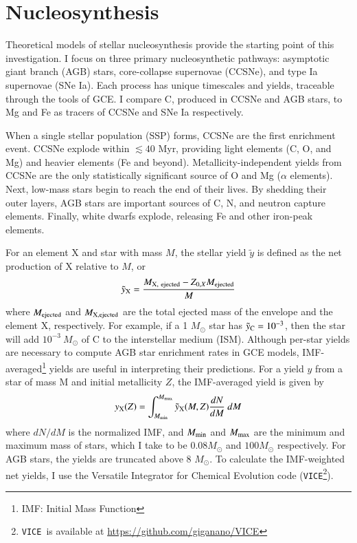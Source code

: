 \documentclass[12pt,oneside]{report}
\newcommand{\VICE}{\texttt{VICE}}
\newcommand{\sun}{\ensuremath{\odot}}
\begin{document}
\chapter{Nucleosynthesis}

Theoretical models of stellar nucleosynthesis provide the starting point of this investigation. I focus on three primary nucleosynthetic pathways: asymptotic giant branch (AGB) stars, core-collapse supernovae (CCSNe), and type Ia supernovae (SNe Ia). Each process has unique timescales and yields, traceable through the tools of GCE. I compare C, produced in CCSNe and AGB stars, to Mg and Fe as tracers of CCSNe and SNe Ia respectively.

When a single stellar population (SSP) forms, CCSNe are the first enrichment event. CCSNe  explode within $\lesssim 40$ Myr, providing light elements (C, O, and Mg) and heavier elements (Fe and beyond). Metallicity-independent yields from CCSNe are the only statistically significant source of O and Mg ($\alpha$ elements). Next, low-mass stars begin to reach the end of their lives. By shedding their outer layers, AGB stars are important sources of C, N, and neutron capture elements.  Finally, white dwarfs explode, releasing Fe and other iron-peak elements.


For an element X and star with mass $M$, the stellar yield $\tilde{y}$ is defined as the net production of X relative to $M$, or
\begin{equation}
    \tilde{y}_{\rm X} = \frac{M_{\rm X,\ ejected} - Z_{0, X} M_{\rm ejected}}{M}   
\end{equation}
where $M_{\rm ejected}$ and $M_{\rm X, ejected}$  are the total ejected mass of the envelope and the element X, respectively. For example, if a 1 $M_\odot$ star has $\tilde{y}_{\rm C} = 10^{-3}$, then the star will add $10^{-3}\ M_\odot$ of C to the interstellar medium (ISM). 
Although per-star yields are necessary to compute AGB star enrichment rates in GCE models, IMF-averaged\footnote{IMF: Initial Mass Function} yields are useful in interpreting their predictions. For a yield $y$ from a star of mass M and initial metallicity $Z$, the IMF-averaged yield is given by 
\begin{equation} \label{eq:imf-yield}
    y_{\rm X}(Z) = 
    \int_{M_{\rm min}}^{M_{\rm max}} 
    \tilde{y}_{\rm X}(M, Z)
    \frac{dN}{dM}  \ dM
\end{equation}
where ${dN}/{dM}$ is the normalized IMF, and $M_{\rm min}$ and $M_{\rm max}$ are the minimum and maximum mass of stars, which I take to be $0.08 M_{\sun}$ and $100 M_{\sun}$ respectively. For AGB stars, the yields are truncated above 8 $M_{\odot}$. 
To calculate the IMF-weighted net yields, I use the Versatile Integrator for Chemical Evolution code (\VICE\footnote{\VICE~is available at \url{https://github.com/giganano/VICE}}).
\end{document}
